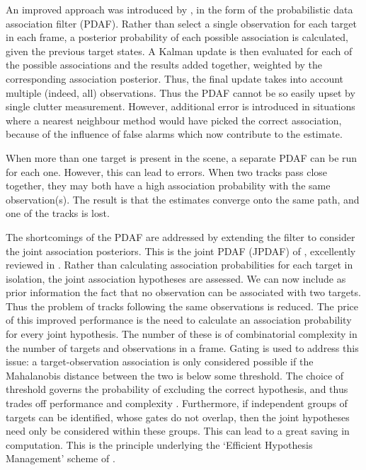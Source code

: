 An improved approach was introduced by \cite{Bar-Shalom1975}, in the form of the probabilistic data association filter (PDAF). Rather than select a single observation for each target in each frame, a posterior probability of each possible association is calculated, given the previous target states. A Kalman update is then evaluated for each of the possible associations and the results added together, weighted by the corresponding association posterior. Thus, the final update takes into account multiple (indeed, all) observations. Thus the PDAF cannot be so easily upset by single clutter measurement. However, additional error is introduced in situations where a nearest neighbour method would have picked the correct association, because of the influence of false alarms which now contribute to the estimate.

When more than one target is present in the scene, a separate PDAF can be run for each one. However, this can lead to errors. When two tracks pass close together, they may both have a high association probability with the same observation(s). The result is that the estimates converge onto the same path, and one of the tracks is lost.

The shortcomings of the PDAF are addressed by extending the filter to consider the joint association posteriors. This is the joint PDAF (JPDAF) of \cite{Fortmann1983}, excellently reviewed in \cite{Bar-Shalom2009}. Rather than calculating association probabilities for each target in isolation, the joint association hypotheses are assessed. We can now include as prior information the fact that no observation can be associated with two targets. Thus the problem of tracks following the same observations is reduced. The price of this improved performance is the need to calculate an association probability for every joint hypothesis. The number of these is of combinatorial complexity in the number of targets and observations in a frame. Gating is used to address this issue: a target-observation association is only considered possible if the Mahalanobis distance between the two is below some threshold. The choice of threshold governs the probability of excluding the correct hypothesis, and thus trades off performance and complexity \cite{Sea1971}. Furthermore, if independent groups of targets can be identified, whose gates do not overlap, then the joint hypotheses need only be considered within these groups. This can lead to a great saving in computation. This is the principle underlying the `Efficient Hypothesis Management' scheme of \cite{Horridge2006}.

